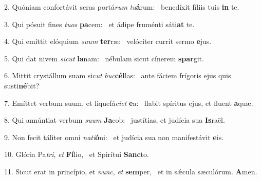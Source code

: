 2. Quóniam confortávit seras portá\textit{rum} \textit{tu}\textbf{á}rum: \ast\  benedíxit fíliis tuis \textbf{in} te.\

3. Qui pósuit fines \textit{tu}\textit{os} \textbf{pa}cem: \ast\  et ádipe fruménti sáti\textbf{at} te.\

4. Qui emíttit elóquium \textit{su}\textit{um} \textbf{ter}ræ: \ast\  velóciter currit sermo \textbf{e}jus.\

5. Qui dat nivem \textit{sic}\textit{ut} \textbf{la}nam: \ast\  nébulam sicut cínerem \textbf{spar}git.\

6. Mittit crystállum suam sic\textit{ut} \textit{buc}\textbf{cél}las: \ast\  ante fáciem frígoris ejus quis susti\textbf{né}bit?\

7. Emíttet verbum suum, et liquefá\textit{ci}\textit{et} \textbf{e}a: \ast\  flabit spíritus ejus, et fluent \textbf{a}quæ.\

8. Qui annúntiat verbum \textit{su}\textit{um} \textbf{Ja}cob: \ast\  justítias, et judícia sua \textbf{Is}raël.\

9. Non fecit táliter omni \textit{na}\textit{ti}\textbf{ó}ni: \ast\  et judícia sua non manifestávit \textbf{e}is.\

10. Glória Pa\textit{tri}, \textit{et} \textbf{Fí}lio, \ast\  et Spirítui \textbf{Sanc}to.\

11. Sicut erat in princípio, et \textit{nunc}, \textit{et} \textbf{sem}per, \ast\  et in sǽcula sæculórum. \textbf{A}men.\

